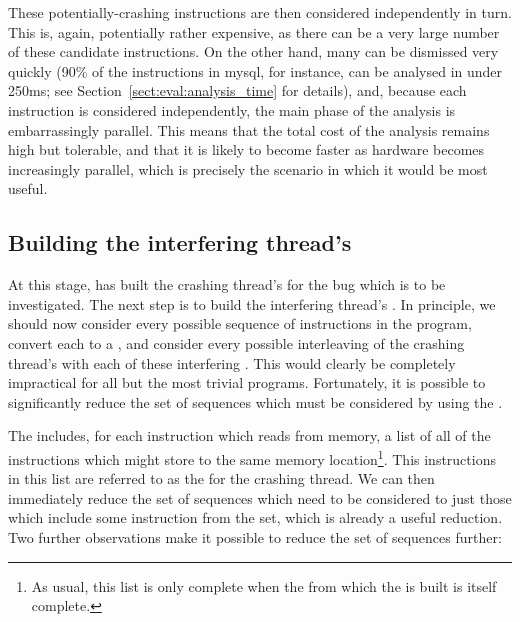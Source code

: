 These potentially-crashing instructions are then considered
independently in turn.  This is, again, potentially rather expensive,
as there can be a very large number of these candidate instructions.
On the other hand, many can be dismissed very quickly (90\% of the
instructions in mysql, for instance, can be analysed in under 250ms;
see Section~\ref{sect:eval:analysis_time} for details), and, because
each instruction is considered independently, the main phase of the
analysis is embarrassingly parallel.  This means that the total cost
of the analysis remains high but tolerable, and that it is likely to
become faster as hardware becomes increasingly parallel, which is
precisely the scenario in which it would be most useful.

\subsection{Building the interfering thread's \StateMachines}
\label{sect:derive:write_side}

At this stage, {\technique} has built the crashing thread's
{\StateMachine} for the bug which is to be investigated.  The next
step is to build the interfering thread's {\StateMachine}.  In
principle, we should now consider every possible sequence of
\backref{$\alpha$} instructions in the program, convert each to a
{\StateMachine}, and consider every possible interleaving of
the crashing thread's {\StateMachine} with each of these
interfering {\StateMachines}.  This would clearly be
completely impractical for all but the most trivial programs.
Fortunately, it is possible to significantly reduce the set of
sequences which must be considered by using the
.

The  includes, for each instruction which reads
from memory, a list of all of the instructions which might store to
the same memory location\footnote{As usual, this list is only complete
  when the  from which the  is built is itself complete.}.  This instructions in this
list are referred to as the  for the
crashing thread.  We can then immediately reduce the set of sequences
which need to be considered to just those which include some
instruction from the  set, which is
already a useful reduction.  Two further observations make it possible
to reduce the set of sequences further:

